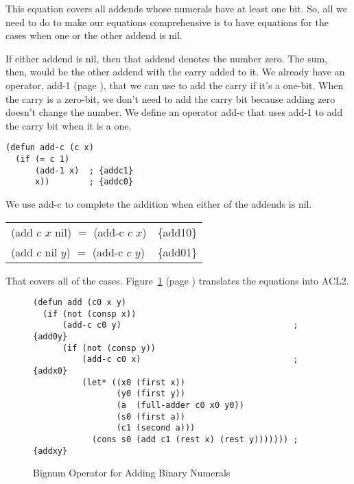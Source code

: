 This equation covers all addends whose numerals have at least one bit.
So, all we need to do to make our equations comprehensive
is to have equations for the cases when one or the other addend is \textsf{nil}.

If either addend is \textsf{nil},
then that addend denotes the number zero.
The sum, then, would be the other addend with the carry added to it.
We already have an operator, \textsf{add-1} (page \pageref{add-1-defun}),
that we can use to add the carry if it's a one-bit.
When the carry is a zero-bit, we don't need to add the carry bit
because adding zero doesn't change the number.
We define an operator \textsf{add-c}
that uses \textsf{add-1} to add the carry bit
when it is a one.

\label{add-c-defun} 
\begin{Verbatim}
(defun add-c (c x)
  (if (= c 1)
      (add-1 x)  ; {addc1}
      x))        ; {addc0}
\end{Verbatim}

We use \textsf{add-c }to complete the addition when either of the addends is \textsf{nil}.
\begin{center}
\begin{tabular}{ll}
\textsf{(add $c$ $x$ nil)} $=$ \textsf{(add-c $c$ $x$)}   & \{add10\} \\
\textsf{(add $c$ nil $y$)} $=$ \textsf{(add-c $c$ $y$)}   & \{add01\} \\
\end{tabular}
\end{center}

That covers all of the cases.
Figure~\ref{fig:bignum-add-defun} (page \pageref{fig:bignum-add-defun})
translates the equations into ACL2.

\begin{figure}
\begin{Verbatim}
(defun add (c0 x y)
  (if (not (consp x))
      (add-c c0 y)                                   ; {add0y}
      (if (not (consp y))
          (add-c c0 x)                               ; {addx0}
          (let* ((x0 (first x))
                 (y0 (first y))
                 (a  (full-adder c0 x0 y0))
                 (s0 (first a))
                 (c1 (second a)))
            (cons s0 (add c1 (rest x) (rest y))))))) ; {addxy}
\end{Verbatim}
\caption{Bignum Operator for Adding Binary Numerals}
\label{fig:bignum-add-defun}
\end{figure}

